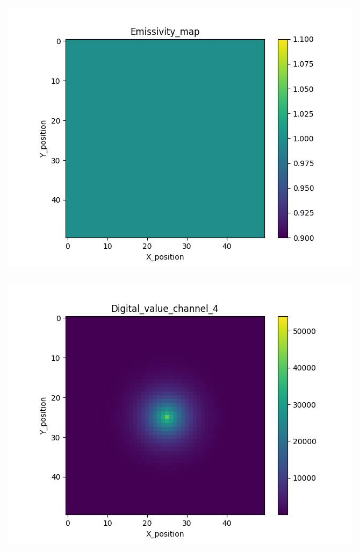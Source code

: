 \begin{figure}[htbp]
    \centering
    \begin{minipage}{\textwidth}
        \centering
        \begin{subfigure}{0.45\textwidth}
            \includegraphics[width=\textwidth]{figures/raw_data/0/emi_field.jpg}
        \end{subfigure}
        \begin{subfigure}{0.45\textwidth}
            \centering
            \includegraphics[width=\textwidth]{figures/raw_data/0/digital_value_channel_4.jpg}
        \end{subfigure}
        \label{fig: raw_data_0}
    \end{minipage}\\

\end{figure}
